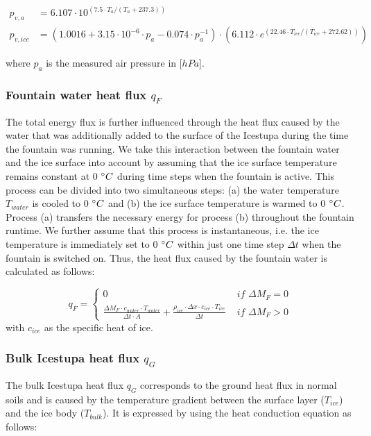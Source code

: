 \documentclass[utf8]{frontiersSCNS} %
\begin{document}
\begin{equation} \begin{split} p_{v,a}&=6.107 \cdot 10^{(7.5 \cdot T_a / (T_a + 237.3))}\\ p_{v,ice}&=(1.0016 +
3.15\cdot10^{-6}\cdot p_{a}-0.074\cdot p_{a}^{-1})\cdot(6.112 \cdot e^{(22.46 \cdot T_{ice} / (T_{ice} + 272.62))})
\end{split} \label{eqn:vp} \end{equation}

where $p_{a}$ is the measured air pressure in [$hPa$].  

\subsubsection{Fountain water heat flux
\texorpdfstring{$q_{F}$}{Lg} }

The total energy flux is further influenced through the heat flux caused by the water that was additionally added to the
surface of the Icestupa during the time the fountain was running. We take this interaction between the fountain water
and the ice surface into account by assuming that the ice surface temperature remains constant at 0 $\degree C$
during time steps when the fountain is active. This process can be divided into two simultaneous steps: (a) the water
temperature $T_{water}$ is cooled to 0 $\degree C$ and (b) the ice surface temperature is warmed to 0 $\degree C$.
Process (a) transfers the necessary energy for process (b) throughout the fountain runtime. We further assume
that this process is instantaneous, i.e. the ice temperature is immediately set to 0 $\degree C$ within just one time
step $\Delta t$ when the fountain is switched on. Thus, the heat flux caused by the fountain water is calculated as
follows:

\begin{equation} 
  q_{F} = \left\{ \begin{array}{ll}
         0 & \textit{ if } \Delta M_{F} = 0\\ \frac{ \Delta M_F \cdot c_{water} \cdot T_{water}}{\Delta t \cdot A} +
         \frac{\rho_{ice} \cdot \Delta x \cdot c_{ice} \cdot T_{ice}}{\Delta t} & \textit{ if } \Delta M_{F} > 0 
    \end{array} \right.  \label{eqn:qF}
\end{equation} 
with $c_{ice}$ as the specific heat of ice. 

\subsubsection{Bulk Icestupa heat flux \texorpdfstring{$q_{G}$}{Lg}} \label{sec:Bulkflux}
The bulk Icestupa heat flux $q_{G}$ corresponds to the ground heat flux in normal soils and is caused by the
temperature gradient between the surface layer ($T_{ice}$) and the ice body ($T_{bulk}$). It is expressed by using the
heat conduction equation as follows:
\end{document}
